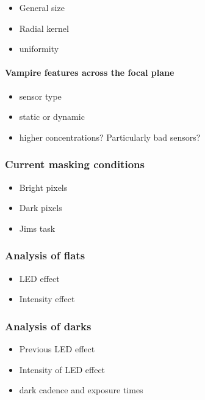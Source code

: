 \begin{itemize}
\tightlist
\item
  General size
\item
  Radial kernel
\item
  uniformity
\end{itemize}

\paragraph{Vampire features across the focal
plane}\label{vampire-features-across-the-focal-plane}

\begin{itemize}
\tightlist
\item
  sensor type
\item
  static or dynamic
\item
  higher concentrations? Particularly bad sensors?
\end{itemize}

\subsubsection{Current masking
conditions}\label{current-masking-conditions}

\begin{itemize}
\tightlist
\item
  Bright pixels
\item
  Dark pixels
\item
  Jim\textquotesingle s task
\end{itemize}

\subsubsection{Analysis of flats}\label{analysis-of-flats}

\begin{itemize}
\tightlist
\item
  LED effect
\item
  Intensity effect
\end{itemize}

\subsubsection{Analysis of darks}\label{analysis-of-darks}

\begin{itemize}
\tightlist
\item
  Previous LED effect
\item
  Intensity of LED effect
\item
  dark cadence and exposure times
\end{itemize}

